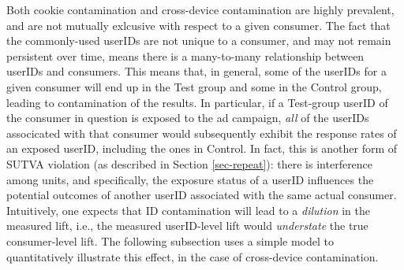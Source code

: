 \documentclass[11pt,a4paper]{article}
\theoremstyle{definition}
\theoremstyle{remark}
\theoremstyle{definition}
\theoremstyle{definition}
\theoremstyle{definition}
\theoremstyle{definition}
\theoremstyle{definition}
\theoremstyle{definition}
\begin{document}
Both cookie contamination and cross-device contamination are highly prevalent, and are not mutually exlcusive with respect to a given consumer. The fact that the commonly-used userIDs are not unique to a consumer, and may not remain persistent over time, means there is a many-to-many relationship between userIDs and consumers. This means that, in general, some of the userIDs for a given consumer will end up in the Test group and some in the Control group, leading to contamination of the results. In particular, if a Test-group userID of the consumer in question is exposed to the ad campaign, \textit{all} of the userIDs associcated with that consumer would subsequently exhibit the response rates of an exposed userID, including the ones in Control. In fact, this is another form of SUTVA violation (as described in Section \ref{sec-repeat}): there is interference among units, and specifically, the exposure status of a userID influences the potential outcomes of another userID associated with the same actual consumer. Intuitively, one expects that ID contamination will lead to a \textit{dilution} in the measured lift, i.e., the measured userID-level lift would \textit{understate} the true consumer-level lift. The following subsection uses a simple model to quantitatively illustrate this effect, in the case of cross-device contamination.
\end{document}
